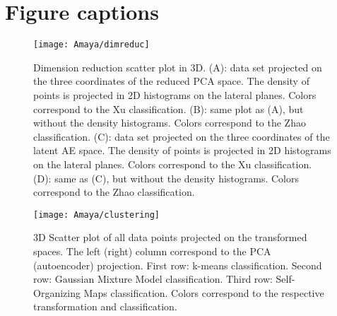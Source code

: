 \documentclass[utf8]{frontiersSCNS} %
\begin{document}
\section*{Figure captions}



\begin{figure}[h!]
	\begin{center}
		\texttt{[image: Amaya/dimreduc]}%
	\end{center}
	\caption{Dimension reduction scatter plot in 3D. (A): data set projected on the three coordinates of the reduced PCA space. The density of points is projected in 2D histograms on the lateral planes. Colors correspond to the Xu classification. (B): same plot as (A), but without the density histograms. Colors correspond to the Zhao classification. (C): data set projected on the three coordinates of the latent AE space. The density of points is projected in 2D histograms on the lateral planes. Colors correspond to the Xu classification. (D): same as (C), but without the density histograms. Colors correspond to the Zhao classification. }\label{fig:dimreduc}
\end{figure}

\begin{figure}[h!]
	\begin{center}
		\texttt{[image: Amaya/clustering]}%
	\end{center}
	\caption{3D Scatter plot of all data points projected on the transformed spaces. The left (right) column correspond to the PCA (autoencoder) projection. First row: k-means classification. Second row: Gaussian Mixture Model classification. Third row: Self-Organizing Maps classification. Colors correspond to the respective transformation and classification.}\label{fig:clustering}
\end{figure}
\end{document}

